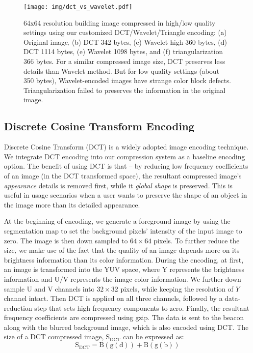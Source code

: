 \begin{figure}[!thb]
    \begin{center}
	    \texttt{[image: img/dct\_vs\_wavelet.pdf]}
	    \caption{\footnotesize 64x64 resolution building image compressed in high/low quality settings using our customized DCT/Wavelet/Triangle encoding: (a) Original image, (b) DCT 342 bytes, (c) Wavelet high 360 bytes, (d) DCT 1114 bytes, (e) Wavelet 1098 bytes, and (f) triangularization 366 bytes. For a similar compressed image size, DCT preserves less details than Wavelet method. But for low quality settings (about 350 bytes), Wavelet-encoded images have strange color block defects. Triangularization failed to preserves the information in the original image.}
	    \label{fig:block7}
    \end{center}
\end{figure}


\subsection{Discrete Cosine Transform Encoding}

Discrete Cosine Transform (DCT) is a widely adopted image encoding technique. We integrate DCT encoding into our compression system as a baseline encoding option. The benefit of using DCT is that -- by reducing low frequency coefficients of an image (in the DCT transformed space), the resultant compressed image's \textit{appearance} details is removed first, while it \textit{global shape} is preserved. This is useful in usage scenarios when a user wants to preserve the shape of an object in the image more than its detailed appearance.

At the beginning of encoding, we generate a foreground image by using the segmentation map to set the background pixels' intensity of the input image to zero. The image is then down sampled to $64 \times 64$ pixels. To further reduce the size, we make use of the fact that the quality of an image depends more on its brightness information than its color information. During the encoding, at first, an image is transformed into the $\mathrm{YUV}$ space, where $\mathrm{Y}$ represents the brightness information and $\mathrm{U/V}$ represents the image color information. We further down sample $\mathrm{U}$ and $\mathrm{V}$ channels into $32 \times 32$ pixels, while keeping the resolution of $Y$ channel intact. Then DCT is applied on all three channels,  followed by a data-reduction step that sets high frequency components to zero. Finally, the resultant frequency coefficients are compressed using gzip. The data is sent to the beacon along with the blurred background image, which is also encoded using DCT. The size of a DCT compressed image, $\mathrm{S_{DCT}}$ can be expressed as:
\begin{equation}
\mathrm{
S_{DCT} = B(g(d)) + B(g(b))}
\end{equation}

